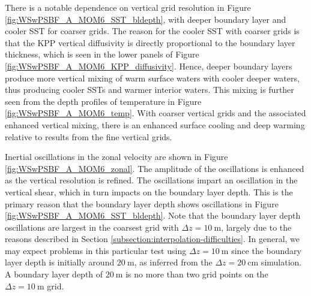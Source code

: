 There is a notable dependence on vertical grid resolution in Figure
\ref{fig:WSwPSBF_A_MOM6_SST_bldepth}, with deeper boundary layer and
cooler SST for coarser grids.  The reason for the cooler SST with
coarser grids is that the KPP vertical diffusivity is directly
proportional to the boundary layer thickness, which is seen in the
lower panels of Figure \ref{fig:WSwPSBF_A_MOM6_KPP_diffusivity}.
Hence, deeper boundary layers produce more vertical mixing of warm
surface waters with cooler deeper waters, thus producing cooler SSTs
and warmer interior waters.  This mixing is further seen from the
depth profiles of temperature in Figure \ref{fig:WSwPSBF_A_MOM6_temp}.
With coarser vertical grids and the associated enhanced vertical
mixing, there is an enhanced surface cooling and deep warming relative
to results from the fine vertical grids.  

Inertial oscillations in the zonal velocity are shown in Figure
\ref{fig:WSwPSBF_A_MOM6_zonal}.  The amplitude of the oscillations is
enhanced as the vertical resolution is refined.  The oscillations
impart an oscillation in the vertical shear, which in turn impacts on
the boundary layer depth.  This is the primary reason that the
boundary layer depth shows oscillations in Figure
\ref{fig:WSwPSBF_A_MOM6_SST_bldepth}.  Note that the boundary layer
depth oscillations are largest in the coarsest grid with $\Delta z =
10~\mbox{m}$, largely due to the reasons described in Section
\ref{subsection:interpolation-difficulties}.  In general, we may
expect problems in this particular test using $\Delta z = 10~\mbox{m}$
since the boundary layer depth is initially around $20~\mbox{m}$, as
inferred from the $\Delta z = 20~\mbox{cm}$ simulation.  A boundary
layer depth of $20~\mbox{m}$ is no more than two grid points on the
$\Delta z = 10~\mbox{m}$ grid.

